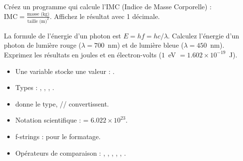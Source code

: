 \begin{exercice}
Cr\'eez un programme qui calcule l'IMC (Indice de Masse Corporelle) : $\text{IMC} = \frac{\text{masse (kg)}}{\text{taille (m)}^2}$. Affichez le r\'esultat avec 1 d\'ecimale.
\end{exercice}

\begin{exercice}
La formule de l'\'energie d'un photon est $E = hf = hc/\lambda$. Calculez l'\'energie d'un photon de lumi\`ere rouge ($\lambda = 700$~nm) et de lumi\`ere bleue ($\lambda = 450$~nm). Exprimez les r\'esultats en joules et en \'electron-volts ($1$~eV $= 1.602 \times 10^{-19}$~J).
\end{exercice}

\begin{formules}[title=\textbf{R\'esum\'e du chapitre}]
\begin{itemize}
\item Une variable stocke une valeur : .
\item Types : , , , .
\item {} donne le type, // convertissent.
\item Notation scientifique :  = $6.022 \times 10^{23}$.
\item f-strings :  pour le formatage.
\item Op\'erateurs de comparaison : \py{==}, \py{!=}, \py{<}, \py{>}, , .
\end{itemize}
\end{formules}
